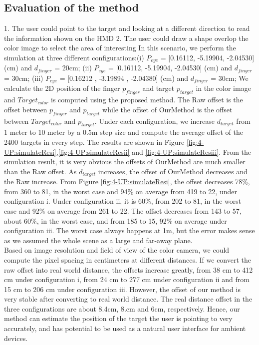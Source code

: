 \subsection{Evaluation of the method}
1. The user could point to the target and looking at a different direction to read the information shown on the HMD  2. The user could draw a shape overlop the color image to select the area of interesting
In this scenario, we perform the simulation at three different configurations:(i) $P_{eye}$ = [0.16112,  -5.19904,  -2.04530] (cm) and $d_{finger}$ = 20cm; (ii) $P_{eye}$ = [0.16112,  -5.19904,  -2.04530] (cm) and $d_{finger}$ = 30cm; (iii) $P_{eye}$ = [0.16212 , -3.19894 , -2.04380] (cm) and $d_{finger}$ = 30cm;
We calculate the 2D position of the finger $p_{finger}$ and target $p_{target}$ in the color image and $Target_{color}$  is computed using the proposed method. The Raw offset is the offset between $p_{finger}$ and $p_{target}$ while the offset of OurMethod is the offset between $Target_{color}$ and $p_{target}$. Under each configuration, we increase $d_{target}$ from 1 meter to 10 meter by a 0.5m step size and compute the average offset of the 2400 targets in every step. The results are shown in Figure \ref{fig:4-UP:simulateResi},\ref{fig:4-UP:simulateResii} and \ref{fig:4-UP:simulateResiii}.  
From the simulation result, it is very obvious the offsets of OurMethod are much smaller than the Raw offset. As $d_{target}$ increases, the offset of OurMethod decreases and the Raw increase. From Figure \ref{fig:4-UP:simulateResi}, the offset decreases 78\%, from 360 to 81, in the worst case and 94\% on average from 419 to 22, under configuration i.  Under configuration ii, it 
is 60\%, from 202 to 81, in the worst case and 92\% on average from 261 to 22. The offset decreases from 143 to 57, about 60\%, in the worst case, and from 185 to 15, 92\% on average under configuration iii.
The worst case always happens at 1m, but the error makes sense as we assumed the whole scene as a large and far-away plane.\\
Based on image resolution and field of view of the color camera, we could compute the pixel spacing in centimeters at different distances. If we convert the raw offset into real world distance, the offsets increase greatly, from 38 cm to 412 cm under configuration i, from 24 cm to 277 cm under configuration ii and from 15 cm to 206 cm under configuration iii. 
However, the offset of our method is very stable after converting to real world distance. 
The real distance offset in the three configurations are about 8.4cm, 8.cm and 6cm, respectively. Hence, our method can estimate the position of the target the user is pointing to very accurately, and has potential to be used as a natural user interface for ambient devices.
